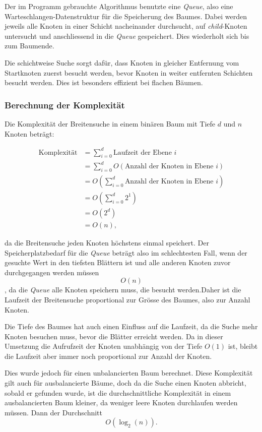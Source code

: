 \documentclass[a4paper,11pt]{article}
\begin{document}
Der im Programm gebrauchte Algorithmus benutzte eine \emph{Queue}, also eine Warteschlangen-Datenstruktur für die Speicherung des Baumes. Dabei werden jeweils alle Knoten in einer Schicht nacheinander durchsucht, auf \emph{child}-Knoten untersucht und anschliessend in die \emph{Queue} gespeichert. Dies wiederholt sich bis zum Baumende.

Die schichtweise Suche sorgt dafür, dass Knoten in gleicher Entfernung vom Startknoten zuerst besucht werden, bevor Knoten in weiter entfernten Schichten besucht werden. Dies ist besonders effizient bei flachen Bäumen.

\subsubsection{Berechnung der Komplexität}

Die Komplexität der Breitensuche in einem binären Baum mit Tiefe $d$ und $n$ Knoten beträgt:

\begin{align}
\text{Komplexität} &= \sum_{i=0}^{d} \text{Laufzeit der Ebene } i \\
&= \sum_{i=0}^{d} O(\text{Anzahl der Knoten in Ebene }i) \\
&= O(\sum_{i=0}^{d} \text{Anzahl der Knoten in Ebene }i) \\
&= O(\sum_{i=0}^{d} 2^1) \\
&= O(2^d) \\
&= O(n),
\end{align}

da die Breitensuche jeden Knoten höchstens einmal speichert. Der Speicherplatzbedarf für die \emph{Queue} beträgt also im schlechtesten Fall, wenn der gesuchte Wert in den tiefsten Blättern ist und alle anderen Knoten zuvor durchgegangen werden müssen $$O(n)$$, da die \emph{Queue} alle Knoten speichern muss, die besucht werden.Daher ist die Laufzeit der Breitensuche proportional zur Grösse des Baumes, also zur Anzahl Knoten.

Die Tiefe des Baumes hat auch einen Einfluss auf die Laufzeit, da die Suche mehr Knoten besuchen muss, bevor die Blätter erreicht werden. Da in dieser Umsetzung die Aufrufzeit der Knoten unabhängig von der Tiefe $O(1)$ ist, bleibt die Laufzeit aber immer noch proportional zur Anzahl der Knoten.

Dies wurde jedoch für einen unbalancierten Baum berechnet. Diese Komplexität gilt auch für ausbalancierte Bäume, doch da die Suche einen Knoten abbricht, sobald er gefunden wurde, ist die durchschnittliche Komplexität in einem ausbalancierten Baum kleiner, da weniger leere Knoten durchlaufen werden müssen. Dann der Durchschnitt $$O(\log_2(n)).$$
\end{document}
